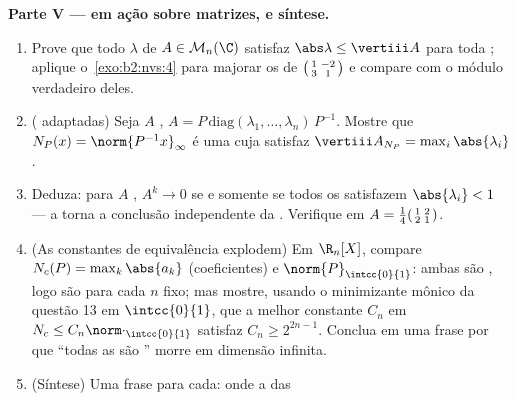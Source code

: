\begin{problem}
\medskip
\noindent\textbf{Parte V ---  em ação sobre matrizes, e
síntese.}
\begin{enumerate}[resume]
  \item Prove que todo  $\lambda$ de $A \in
        \mathcal{M}_n(\C)$ satisfaz $\abs\lambda \leq
        \vertiii A$ para toda ; aplique
        o~\cref{exo:b2:nvs:4} para majorar os  de
        $\begin{psmallmatrix}1 & -2\\ 3 & 1\end{psmallmatrix}$
        e compare com o módulo verdadeiro deles.
  \item ( adaptadas) Seja $A$ , $A =
        P\,\mathrm{diag}(\lambda_1, \dots, \lambda_n)\,P^{-1}$.
        Mostre que $N_P(x) = \norm{P^{-1}x}_\infty$ é uma  cuja
         satisfaz $\vertiii A_{N_P} =
        \max_i\abs{\lambda_i}$.
  \item Deduza: para $A$ , $A^k \to 0$ se e somente
        se todos os  satisfazem $\abs{\lambda_i} < 1$ ---
        a  torna a conclusão
        independente da . Verifique em $A =
        \frac14\begin{psmallmatrix}1 & 2\\ 2 &
        1\end{psmallmatrix}$.
  \item (As constantes de equivalência explodem) Em $\R_n[X]$, compare
        $N_c(P) = \max_k \abs{a_k}$ (coeficientes) e
        $\norm{P}_{\intcc{0}{1}}$: ambas são , logo são
         para cada $n$ fixo; mas mostre, usando o
        minimizante mônico da questão 13 em $\intcc{0}{1}$, que a
        melhor constante $C_n$ em $N_c \leq
        C_n\norm\cdot_{\intcc{0}{1}}$ satisfaz $C_n \geq
        2^{2n-1}$. Conclua em uma frase por que ``todas as  são
        '' morre em dimensão infinita.
  \item (Síntese) Uma frase para cada: onde a  das

\end{enumerate}
\end{problem}
